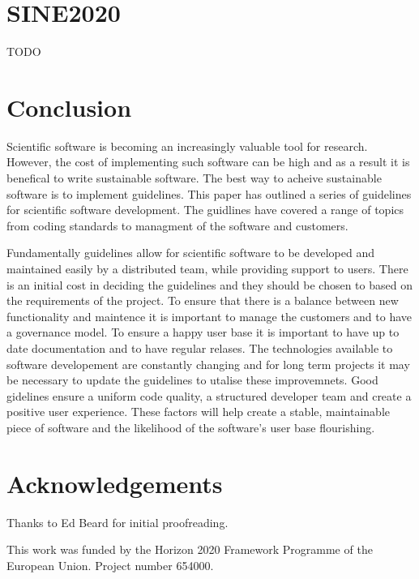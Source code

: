 \documentclass[jnr]{iosart2x}
\begin{document}
\section{SINE2020}
\label{SINE2020}

TODO

\section{Conclusion}
\label{Conclusion}

Scientific software is becoming an increasingly valuable tool for research.
However, the cost of implementing such software can be high and as a result it is benefical to write sustainable software.
The best way to acheive sustainable software is to implement guidelines.
This paper has outlined a series of guidelines for scientific software development.
The guidlines have covered a range of topics from coding standards to managment of the software and customers.

Fundamentally guidelines allow for scientific software to be developed and maintained easily by a distributed team, while providing support to users.
There is an initial cost in deciding the guidelines and they should be chosen to based on the requirements of the project.
To ensure that there is a balance between new functionality and maintence it is important to manage the customers and to have a governance model.
To ensure a happy user base it is important to have up to date documentation and to have regular relases.
The technologies available to software developement are constantly changing and for long term projects it may be necessary to update the guidelines to utalise these improvemnets.
Good gidelines ensure a uniform code quality, a structured developer team and create a positive user experience.
These factors will help create a stable, maintainable piece of software and the likelihood of the software's user base flourishing.

\section{Acknowledgements}
\label{Acknowledgements}

Thanks to Ed Beard for initial proofreading.

This work was funded by the Horizon 2020 Framework Programme of the European Union.
Project number 654000.



\nocite{*}


\end{document}
